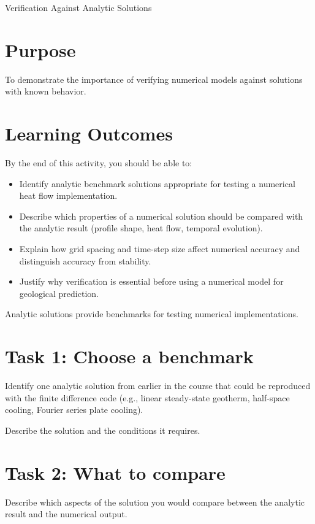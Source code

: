 \begin{activity}{Verification Against Analytic Solutions}

\section*{Purpose}
To demonstrate the importance of verifying numerical models against solutions
with known behavior.

{\color{red}
\section*{Learning Outcomes}

By the end of this activity, you should be able to:
\begin{itemize}
  \item Identify analytic benchmark solutions appropriate for testing a numerical heat flow implementation.
  \item Describe which properties of a numerical solution should be compared with the analytic result (profile shape, heat flow, temporal evolution).
  \item Explain how grid spacing and time-step size affect numerical accuracy and distinguish accuracy from stability.
  \item Justify why verification is essential before using a numerical model for geological prediction.
\end{itemize}
}

Analytic solutions provide benchmarks for testing numerical implementations.

\section*{Task 1: Choose a benchmark}

Identify one analytic solution from earlier in the course that could be reproduced with the finite difference code (e.g., linear steady-state geotherm, half-space cooling, Fourier series plate cooling).

Describe the solution and the conditions it requires.
\answerbox[4cm]

\section*{Task 2: What to compare}

Describe which aspects of the solution you would compare between the analytic result and the numerical output.


\end{activity}
